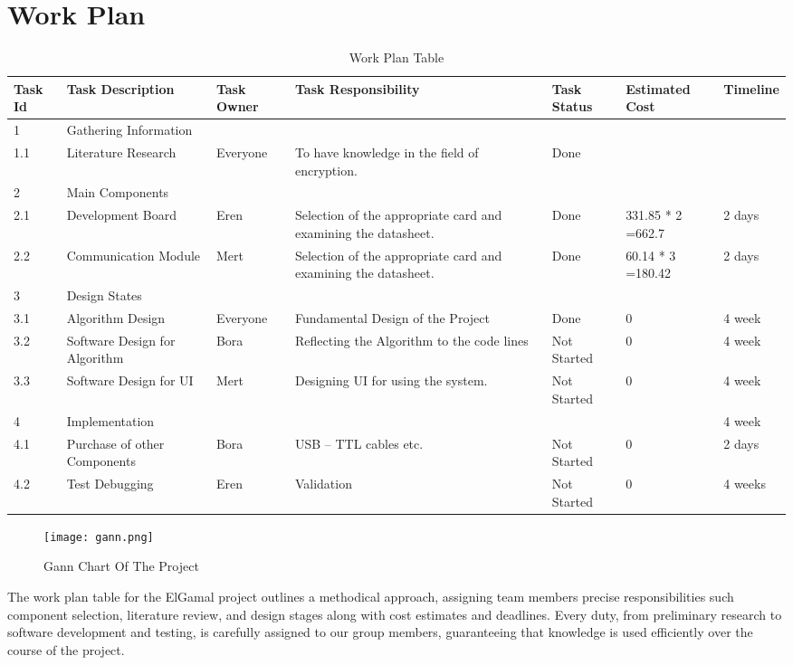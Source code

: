 \documentclass[12pt]{article}
\begin{document}
 	\section{Work Plan}
	\begin{table}[H]

 		\renewcommand{\arraystretch}{0.2}
 	\centering
 	\begin{tabular}{|p{1cm}|p{2.75cm}|p{1.6cm}|p{2.5cm}|p{1.25cm}|p{1.5cm}|p{2cm}|}	\hline
 		
 		Task Id & Task Description & Task Owner & Task Responsibility & Task Status & Estimated Cost & Timeline \\
 		\hline
 	
		
 		1 & Gathering Information &  &  &  & & \\  \hline
 		1.1 & Literature Research & Everyone & To have knowledge in the field of encryption. & Done &  & \\  \hline
 		2 & Main Components &  &  &  &  & \\  \hline
 		2.1 & Development Board & Eren & Selection of the appropriate card and  examining the datasheet.& Done & 331.85 * 2 =662.7  & 2 days \\  \hline
 		2.2 & Communication Module & Mert & Selection of the appropriate card and  examining the datasheet.  & Done  & 60.14 * 3 =180.42  & 2 days  \\  \hline
 		3 & Design States &  &  &  &  & \\  \hline
 		3.1 & Algorithm Design & Everyone & Fundamental Design of the Project  & Done  & 0  & 4 week  \\  \hline
 		3.2 & Software Design for Algorithm & Bora  & Reflecting the Algorithm to the code lines  & Not Started  & 0 & 4 week\\  \hline
 		3.3& Software Design for UI & Mert  & Designing UI for using the system. & Not Started  & 0  & 4 week \\  \hline
 		4 & Implementation &   &  &   &   & 4 week \\  \hline
 		4.1 & Purchase of other Components & Bora  & USB – TTL cables etc.  & Not Started  & 0 & 2 days  \\  \hline
 		4.2 & Test Debugging& Eren  & Validation  & Not Started  & 0  & 4 weeks  \\
 		\hline
 	
 	\end{tabular}
 		\caption{Work Plan Table}
\end{table}
	\begin{figure}[H]
	\centering
	\label{gann}
	\texttt{[image: gann.png]}\\[0.5 cm]
	\caption{Gann Chart Of The Project}
\end{figure}
The work plan table for the ElGamal project outlines a methodical approach, assigning team members precise responsibilities such component selection, literature review, and design stages along with cost estimates and deadlines. Every duty, from preliminary research to software development and testing, is carefully assigned to our group members, guaranteeing that knowledge is used efficiently over the course of the project.
\end{document}
